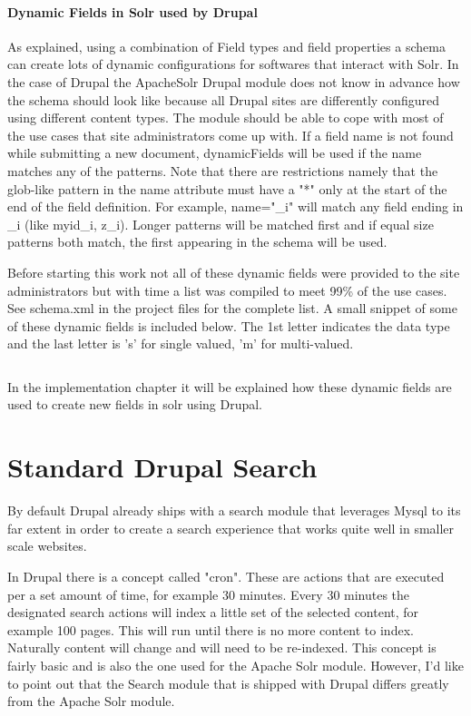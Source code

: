 \paragraph{Dynamic Fields in Solr used by Drupal}
As explained, using a combination of Field types and field properties a schema can create lots of dynamic configurations for softwares that interact with Solr. In the case of Drupal the ApacheSolr Drupal module does not know in advance how the schema should look like because all Drupal sites are differently configured using different content types. The module should be able to cope with most of the use cases that site administrators come up with. If a field name is not found while submitting a new document, dynamicFields will be used if the name matches any of the patterns. Note that there are restrictions namely that the glob-like pattern in the name attribute must have a "*" only at the start of the end of the field definition. For example, name="\*\_i" will match any field ending in \_i (like myid\_i, z\_i). Longer patterns will be matched first and if equal size patterns both match, the first appearing in the schema will be used.
 
Before starting this work not all of these dynamic fields were provided to the site administrators but with time a list was compiled to meet 99\% of the use cases.  See schema.xml in the project files for the complete list. A small snippet of some of these dynamic fields is included below. The 1st letter indicates the data type and the last letter is 's' for single valued, 'm' for multi-valued.

\inputminted[fontsize=\scriptsize,linenos]{xml}{./code_examples/schema_dynamicfields.xml}

\noindent In the implementation chapter it will be explained how these dynamic fields are used to create new fields in solr using Drupal.


\section{Standard Drupal Search}
By default Drupal already ships with a search module that leverages Mysql to its far extent in order to create a search experience that works quite well in smaller scale websites.

In Drupal there is a concept called "cron". These are actions that are executed per a set amount of time, for example 30 minutes. Every 30 minutes the designated search actions will index a little set of the selected content, for example 100 pages. This will run until there is no more content to index. Naturally content will change and will need to be re-indexed. This concept is fairly basic and is also the one used for the Apache Solr module. 
However, I'd like to point out that the Search module that is shipped with Drupal differs greatly from the Apache Solr module. 

